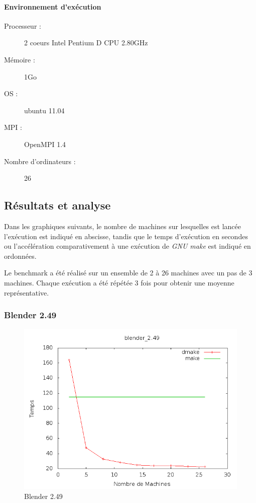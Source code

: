 \documentclass[a4paper,12pt,twoside]{article}
\begin{document}
\paragraph{Environnement d'exécution}
\begin{description}
\item[Processeur :] 2 coeurs Intel Pentium D CPU 2.80GHz
\item[Mémoire :] 1Go
\item[OS :] ubuntu 11.04
\item[MPI :] OpenMPI 1.4
\item[Nombre d’ordinateurs :] 26
\end{description}

\subsection{Résultats et analyse}

Dans les graphiques suivants, le nombre de machines sur lesquelles est
lancée l'exécution est indiqué en abscisse, tandis que le temps
d'exécution en secondes ou l'accélération comparativement à une
exécution de \emph{GNU make} est indiqué en ordonnées.

Le benchmark a été réalisé sur un ensemble de 2 à 26 machines avec un pas de 3 machines. Chaque
exécution a été répétée 3 fois pour obtenir une moyenne
représentative.


\subsubsection{Blender 2.49}


\begin{figure}[h]
  \centering
  \includegraphics[scale=0.5]{graph_blender_2_49.png}
  \caption{Blender 2.49}
  \label{fig:blender249}
\end{figure}
\end{document}
